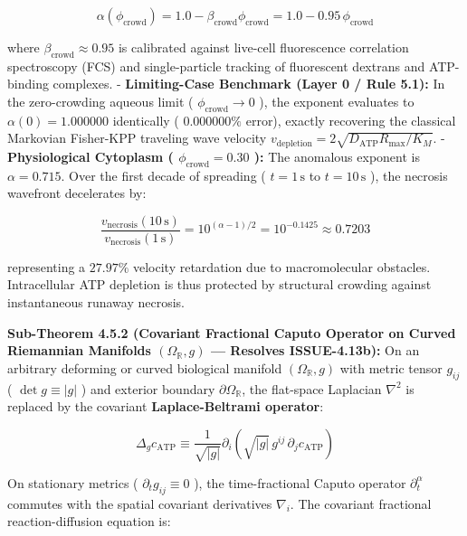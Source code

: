 \documentclass[11pt,a4paper]{article}
\theoremstyle{definition}
\theoremstyle{remark}
\begin{document}
\begin{equation}
\boxed{\alpha(\phi_{\text{crowd}}) = 1.0 - \beta_{\text{crowd}} \phi_{\text{crowd}} = 1.0 - 0.95 \, \phi_{\text{crowd}}}
\end{equation}


where $\beta_{\text{crowd}} \approx 0.95$ is calibrated against live-cell fluorescence correlation spectroscopy (FCS) and single-particle tracking of fluorescent dextrans and ATP-binding complexes.
- \textbf{Limiting-Case Benchmark (Layer 0 / Rule 5.1):} In the zero-crowding aqueous limit ( $\phi_{\text{crowd}} \to 0$ ), the exponent evaluates to $\alpha(0) = 1.000000$ identically ( $0.000000\%$ error), exactly recovering the classical Markovian Fisher-KPP traveling wave velocity $v_{\text{depletion}} = 2\sqrt{D_{\text{ATP}} R_{\max} / K_M}$.
- \textbf{Physiological Cytoplasm ( $\phi_{\text{crowd}} = 0.30$ ):} The anomalous exponent is $\alpha = 0.715$. Over the first decade of spreading ( $t = 1\,\mathrm{s}$ to $t = 10\,\mathrm{s}$ ), the necrosis wavefront decelerates by:


\begin{equation}
\frac{v_{\text{necrosis}}(10\,\mathrm{s})}{v_{\text{necrosis}}(1\,\mathrm{s})} = 10^{(\alpha - 1)/2} = 10^{-0.1425} \approx 0.7203
\end{equation}


representing a $27.97\%$ velocity retardation due to macromolecular obstacles. Intracellular ATP depletion is thus protected by structural crowding against instantaneous runaway necrosis.

\textbf{Sub-Theorem 4.5.2 (Covariant Fractional Caputo Operator on Curved Riemannian Manifolds $(\Omega_{\mathbb{R}}, g)$ — Resolves ISSUE-4.13b):}
On an arbitrary deforming or curved biological manifold $(\Omega_{\mathbb{R}}, g)$ with metric tensor $g_{ij}$ ( $\det g \equiv |g|$ ) and exterior boundary $\partial \Omega_{\mathbb{R}}$, the flat-space Laplacian $\nabla^2$ is replaced by the covariant \textbf{Laplace-Beltrami operator}:


\begin{equation}
\Delta_g c_{\text{ATP}} \equiv \frac{1}{\sqrt{|g|}} \partial_i \left( \sqrt{|g|} \, g^{ij} \, \partial_j c_{\text{ATP}} \right)
\end{equation}


On stationary metrics ( $\partial_t g_{ij} \equiv 0$ ), the time-fractional Caputo operator $\partial_t^\alpha$ commutes with the spatial covariant derivatives $\nabla_i$. The covariant fractional reaction-diffusion equation is:
\end{document}
